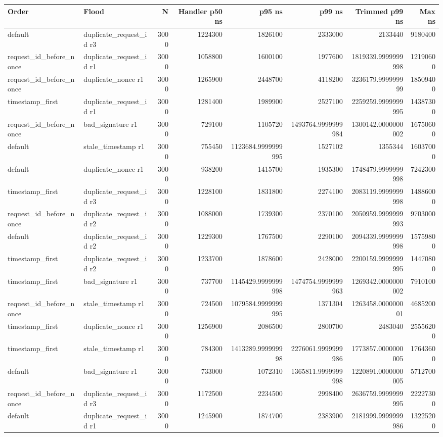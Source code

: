 \begin{tabular}{llrrrrrr}\toprule
Order & Flood & N & Handler p50 ns & p95 ns & p99 ns & Trimmed p99 ns & Max ns \\
\midrule
default & duplicate_request_id r3 & 3000 & 1224300 & 1826100 & 2333000 & 2133440 & 9180400 \\
request_id_before_nonce & duplicate_request_id r1 & 3000 & 1058800 & 1600100 & 1977600 & 1819339.9999999998 & 12190600 \\
request_id_before_nonce & duplicate_nonce r1 & 3000 & 1265900 & 2448700 & 4118200 & 3236179.999999999 & 18509400 \\
timestamp_first & duplicate_request_id r1 & 3000 & 1281400 & 1989900 & 2527100 & 2259259.9999999995 & 14387300 \\
request_id_before_nonce & bad_signature r1 & 3000 & 729100 & 1105720 & 1493764.9999999984 & 1300142.0000000002 & 16750600 \\
default & stale_timestamp r1 & 3000 & 755450 & 1123684.9999999995 & 1527102 & 1355344 & 16037000 \\
default & duplicate_nonce r1 & 3000 & 938200 & 1415700 & 1935300 & 1748479.9999999998 & 7242300 \\
timestamp_first & duplicate_request_id r3 & 3000 & 1228100 & 1831800 & 2274100 & 2083119.9999999998 & 14886000 \\
request_id_before_nonce & duplicate_request_id r2 & 3000 & 1088000 & 1739300 & 2370100 & 2050959.9999999993 & 9703000 \\
default & duplicate_request_id r2 & 3000 & 1229300 & 1767500 & 2290100 & 2094339.9999999998 & 15759800 \\
timestamp_first & duplicate_request_id r2 & 3000 & 1233700 & 1878600 & 2428000 & 2200159.9999999995 & 14470800 \\
timestamp_first & bad_signature r1 & 3000 & 737700 & 1145429.9999999998 & 1474754.9999999963 & 1269342.0000000002 & 7910100 \\
request_id_before_nonce & stale_timestamp r1 & 3000 & 724500 & 1079584.9999999995 & 1371304 & 1263458.000000001 & 4685200 \\
timestamp_first & duplicate_nonce r1 & 3000 & 1256900 & 2086500 & 2800700 & 2483040 & 25556200 \\
timestamp_first & stale_timestamp r1 & 3000 & 784300 & 1413289.999999998 & 2276061.9999999986 & 1773857.0000000005 & 17643600 \\
default & bad_signature r1 & 3000 & 733000 & 1072310 & 1365811.9999999998 & 1220891.0000000005 & 5712700 \\
request_id_before_nonce & duplicate_request_id r3 & 3000 & 1172500 & 2234500 & 2998400 & 2636759.9999999995 & 22227300 \\
default & duplicate_request_id r1 & 3000 & 1245900 & 1874700 & 2383900 & 2181999.9999999986 & 13225200 \\
\bottomrule\end{tabular}
